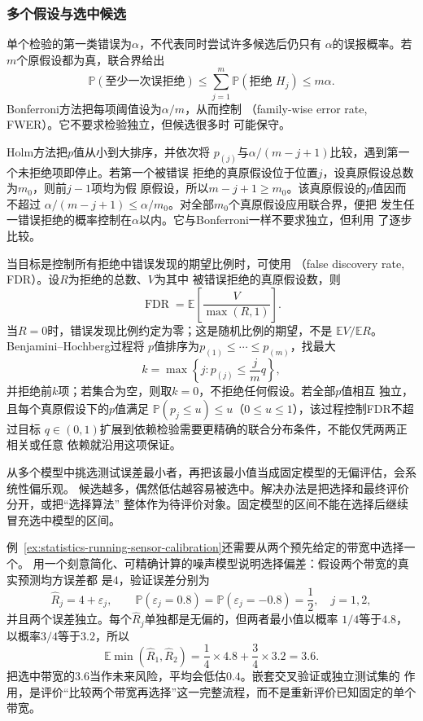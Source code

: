 \subsubsection{多个假设与选中候选}

单个检验的第一类错误为\(\alpha\)，不代表同时尝试许多候选后仍只有
\(\alpha\)的误报概率。若\(m\)个原假设都为真，联合界给出
\[
  \mathbb{P}(\text{至少一次误拒绝})
  \leq\sum_{j=1}^m\mathbb{P}(\text{拒绝 }H_j)
  \leq m\alpha.
\]
Bonferroni方法把每项阈值设为\(\alpha/m\)，从而控制
（family-wise error rate, FWER）。它不要求检验独立，但候选很多时
可能保守。

Holm方法把\(p\)值从小到大排序，并依次将
\(p_{(j)}\)与\(\alpha/(m-j+1)\)比较，遇到第一个未拒绝项即停止。若第一个被错误
拒绝的真原假设位于位置\(j\)，设真原假设总数为\(m_0\)，则前\(j-1\)项均为假
原假设，所以\(m-j+1\geq m_0\)。该真原假设的\(p\)值因而不超过
\(\alpha/(m-j+1)\leq\alpha/m_0\)。对全部\(m_0\)个真原假设应用联合界，便把
发生任一错误拒绝的概率控制在\(\alpha\)以内。它与Bonferroni一样不要求独立，但利用
了逐步比较。

当目标是控制所有拒绝中错误发现的期望比例时，可使用
（false discovery rate, FDR）。设\(R\)为拒绝的总数、\(V\)为其中
被错误拒绝的真原假设数，则
\[
  \operatorname{FDR}=\mathbb E\left[\frac{V}{\max(R,1)}\right].
\]
当\(R=0\)时，错误发现比例约定为零；这是随机比例的期望，不是
\(\mathbb EV/\mathbb ER\)。Benjamini--Hochberg过程将
\(p\)值排序为\(p_{(1)}\leq\cdots\leq p_{(m)}\)，找最大
\[
  k=\max\left\{j:p_{(j)}\leq\frac{j}{m}q\right\},
\]
并拒绝前\(k\)项；若集合为空，则取\(k=0\)，不拒绝任何假设。若全部\(p\)值相互
独立，且每个真原假设下的\(p\)值满足
\(\mathbb P(p_j\leq u)\leq u\)（\(0\leq u\leq1\)），该过程控制FDR不超过目标
\(q\in(0,1)\)扩展到依赖检验需要更精确的联合分布条件，不能仅凭两两正相关或任意
依赖就沿用这项保证。

从多个模型中挑选测试误差最小者，再把该最小值当成固定模型的无偏评估，会系统性偏乐观。
候选越多，偶然低估越容易被选中。解决办法是把选择和最终评价分开，或把“选择算法”
整体作为待评价对象。固定模型的区间不能在选择后继续冒充选中模型的区间。

例~\ref{ex:statistics-running-sensor-calibration}还需要从两个预先给定的带宽中选择一个。
用一个刻意简化、可精确计算的噪声模型说明选择偏差：假设两个带宽的真实预测均方误差都
是\(4\)，验证误差分别为
\[
  \widehat R_j=4+\varepsilon_j,\qquad
  \mathbb{P}(\varepsilon_j=0.8)
  =\mathbb{P}(\varepsilon_j=-0.8)=\frac12,
  \quad j=1,2,
\]
并且两个误差独立。每个\(\widehat R_j\)单独都是无偏的，但两者最小值以概率
\(1/4\)等于\(4.8\)，以概率\(3/4\)等于\(3.2\)，所以
\[
  \mathbb{E}\min(\widehat R_1,\widehat R_2)
  =\frac14\times4.8+\frac34\times3.2
  =3.6.
\]
把选中带宽的\(3.6\)当作未来风险，平均会低估\(0.4\)。嵌套交叉验证或独立测试集的
作用，是评价“比较两个带宽再选择”这一完整流程，而不是重新评价已知固定的单个带宽。

